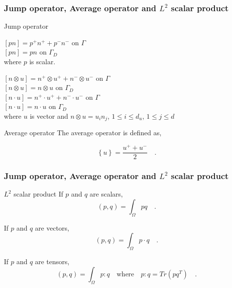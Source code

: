 \documentclass{beamer}
\begin{document}
\begin{frame}
\frametitle{Jump operator, Average operator and $L^2$ scalar product}

\begin{block}{Jump operator}

\begin{center}
$[pn] = p^+ n^+ + p^- n^- $ on $\Gamma$\\
$[pn] = p n $ on $\Gamma_D$\\
where $p$ is scalar.
\end{center}

\begin{center}
$[n \otimes u] = n^+ \otimes u^+ + n^- \otimes u^-$ on $\Gamma$\\
$[n \otimes u] = n \otimes u$ on $\Gamma_D$\\
$[n \cdot u] = n^+ \cdot u^+ + n^- \cdot u^-$ on $\Gamma$\\
$[n \cdot u] = n \cdot u$ on $\Gamma_D$\\
where $u$ is vector and $n \otimes u = u_i n_j$, $1 \leq i \leq d_u$, $1 \leq j \leq d$\\ 
\end{center}
\end{block}

\begin{block}{Average operator}
The average operator is defined as,

\begin{equation}\label{average operator}
\left\lbrace u \right\rbrace = \frac{u^+ + u^-}{2}  \quad \textrm{.}
\end{equation} 

\end{block}

\end{frame}


\begin{frame}
\frametitle{Jump operator, Average operator and $L^2$ scalar product}

\begin{block}{$L^2$ scalar product}
If $p$ and $q$ are scalars,
\begin{equation}\label{inner product scalars}
(p,q)=\int_{\Omega} pq \quad \textrm{.}
\end{equation}

If $p$ and $q$ are vectors,
\begin{equation}\label{Inner product vectors}
(p,q)=\int_{\Omega} p \cdot q \quad \textrm{.}
\end{equation}

If $p$ and $q$ are tensors,
\begin{equation}\label{Inner product tensors}
(p,q)=\int_{\Omega} p : q \quad \textrm{where} \quad p:q = Tr(pq^T) \quad \textrm{.}
\end{equation}
\end{block}

\end{frame}
\end{document}
